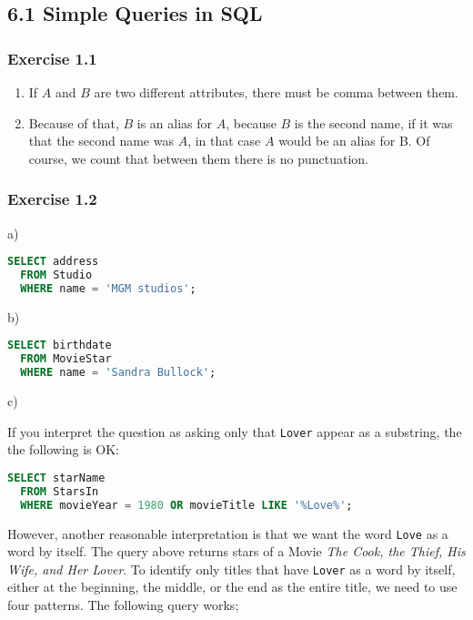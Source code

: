 \documentclass[../../main.tex]{subfiles}
\begin{document}
\subsection*{6.1 Simple Queries in SQL}

\subsubsection*{Exercise 1.1}

\begin{enumerate}
  \item If $A$ and $B$ are two different attributes, there
        must be comma between them.
  \item Because of that, $B$ is an alias for $A$, because
        $B$ is the second name, if it was that the second
        name was $A$, in that case $A$ would be an alias
        for B. Of course, we count that between them there
        is no punctuation.
\end{enumerate}

\subsubsection*{Exercise 1.2}


a)

\begin{lstlisting}[language=sql]
  SELECT address
  FROM Studio
  WHERE name = 'MGM studios';
\end{lstlisting}

b)

\begin{lstlisting}[language=sql]
  SELECT birthdate
  FROM MovieStar
  WHERE name = 'Sandra Bullock';
\end{lstlisting}

\hypertarget{Solution6.1.2c}{c)}

If you interpret the question as asking only that \verb|Lover|
appear as a substring, the the following is OK:

\begin{lstlisting}[language=sql]
  SELECT starName
  FROM StarsIn
  WHERE movieYear = 1980 OR movieTitle LIKE '%Love%';
\end{lstlisting}

However, another reasonable interpretation is that we want
the word \verb|Love| as a word by itself. The query above
returns stars of a Movie \emph{The Cook, the Thief, His
Wife, and Her Lover}. To identify only titles that have
\verb|Lover| as a word by itself, either at the beginning,
the middle, or the end as the entire title, we need to use
four patterns. The following query works;
\end{document}
